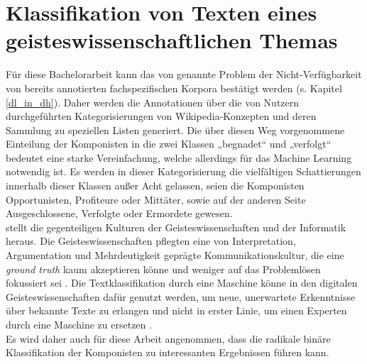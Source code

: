 \documentclass[ngerman]{ttlab-qualify}
\begin{document}
\section{Klassifikation von Texten eines geisteswissenschaftlichen Themas}
Für diese Bachelorarbeit kann das von \textcite{dl_in_dh} genannte Problem der Nicht-Verfügbarkeit von bereits annotierten fachspezifischen Korpora bestätigt werden (s. Kapitel \ref{dl_in_dh}). Daher werden die Annotationen über die von Nutzern durchgeführten Kategorisierungen von Wikipedia-Konzepten und deren Sammlung zu speziellen Listen generiert. Die über diesen Weg vorgenommene Einteilung der Komponisten in die zwei Klassen „begnadet“ und „verfolgt“ bedeutet eine starke Vereinfachung, welche allerdings für das Machine Learning notwendig ist. Es werden in dieser Kategorisierung die vielfältigen Schattierungen innerhalb dieser Klassen außer Acht gelassen, seien die Komponisten Opportunisten, Profiteure oder Mittäter, sowie auf der anderen Seite Ausgeschlossene, Verfolgte oder Ermordete gewesen.\\
\textcite{Kirschenbaum2007TheRO} stellt die gegenteiligen Kulturen der Geisteswissenschaften und der Informatik heraus. Die Geisteswissenschaften pflegten eine von Interpretation, Argumentation und Mehrdeutigkeit geprägte Kommunikationskultur, die eine \textit{ground truth} kaum akzeptieren könne und weniger auf das Problemlösen fokussiert sei \parencite[vgl.][S. 1]{Kirschenbaum2007TheRO}. Die Textklassifikation durch eine Maschine könne in den digitalen Geisteswissenschaften dafür genutzt werden, um neue, unerwartete Erkenntnisse über bekannte Texte zu erlangen und nicht in erster Linie, um einen Experten durch eine Maschine zu ersetzen \parencite{Kirschenbaum2007TheRO}.\\
Es wird daher auch für diese Arbeit angenommen, dass die radikale binäre Klassifikation der Komponisten zu interessanten Ergebnissen führen kann.
\end{document}
